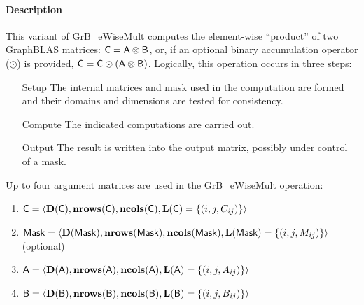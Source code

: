 \paragraph{Description}

This variant of {\sf GrB\_eWiseMult} computes the element-wise ``product'' of
two GraphBLAS matrices: ${\sf C} = {\sf A} \otimes {\sf B}$, or, if an optional
binary accumulation operator ($\odot$) is provided, ${\sf C} = {\sf C} \odot
\left({\sf A} \otimes {\sf B}\right)$.  Logically, this operation occurs in
three steps:
\begin{enumerate}[leftmargin=0.75in]
\item[Setup] The internal matrices and mask used in the computation are formed 
and their domains and dimensions are tested for consistency.
\item[Compute] The indicated computations are carried out.
\item[Output] The result is written into the output matrix, possibly under 
control of a mask.
\end{enumerate}

Up to four argument matrices are used in the {\sf GrB\_eWiseMult} operation:
\begin{enumerate}
	\item ${\sf C} = \langle \bold{D}({\sf C}),\bold{nrows}({\sf C}),\bold{ncols}({\sf C}),\bold{L}({\sf C}) = \{(i,j,C_{ij}) \} \rangle$
	\item ${\sf Mask} = \langle \bold{D}({\sf Mask}),\bold{nrows}({\sf Mask}),\bold{ncols}({\sf Mask}),\bold{L}({\sf Mask}) = \{(i,j,M_{ij}) \} \rangle$ (optional)
	\item ${\sf A} = \langle \bold{D}({\sf A}),\bold{nrows}({\sf A}), \bold{ncols}({\sf A}),\bold{L}({\sf A}) = \{(i,j,A_{ij}) \} \rangle$
	\item ${\sf B} = \langle \bold{D}({\sf B}),\bold{nrows}({\sf B}), \bold{ncols}({\sf B}),\bold{L}({\sf B}) = \{(i,j,B_{ij}) \} \rangle$
\end{enumerate}

